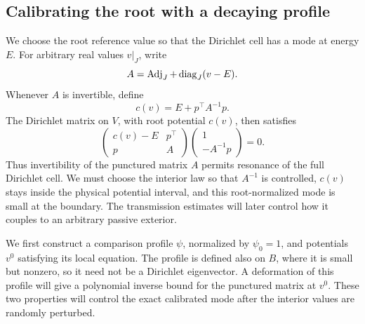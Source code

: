 \subsection{Calibrating the root with a decaying profile}

We choose the root reference value so that the Dirichlet cell has a mode
at energy $E$. For arbitrary real values $v|_J$, write
\[
 A=\operatorname{Adj}_J+\operatorname{diag}_J(v-E).
\]
Whenever $A$ is invertible, define
\begin{equation}
 c(v)=E+p^\top A^{-1}p.
 \label{cell:calibrated-root}
\end{equation}
The Dirichlet matrix on $V$, with root potential $c(v)$, then satisfies
\begin{equation}
 \begin{pmatrix}c(v)-E&p^\top\\p&A\end{pmatrix}
 \begin{pmatrix}1\\-A^{-1}p\end{pmatrix}=0.
 \label{cell:dirichlet-mode}
\end{equation}
Thus invertibility of the punctured matrix $A$ permits resonance of the
full Dirichlet cell. We must choose the interior law so that $A^{-1}$ is
controlled, $c(v)$ stays inside the physical potential interval, and this
root-normalized mode is small at the boundary. The transmission estimates
will later control how it couples to an arbitrary passive exterior.

We first construct a comparison profile $\psi$, normalized by $\psi_0=1$,
and potentials $v^0$ satisfying its local equation. The profile is defined
also on $B$, where it is small but nonzero, so it need not be a Dirichlet
eigenvector. A deformation of this profile will give a polynomial inverse
bound for the punctured matrix at $v^0$. These two properties will control
the exact calibrated mode after the interior values are randomly perturbed.

